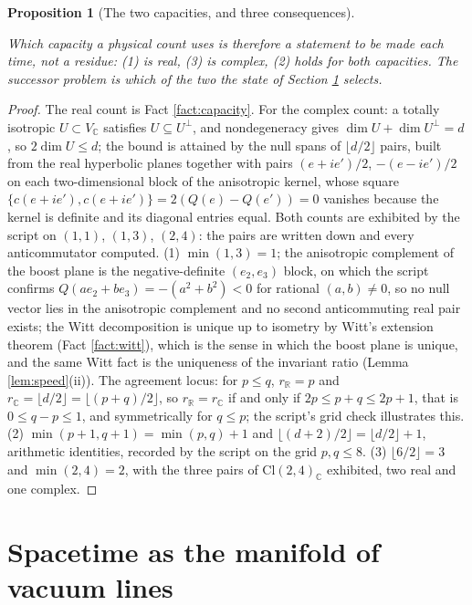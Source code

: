 \documentclass[11pt]{article}
\newtheorem{proposition}[theorem]{Proposition}
\theoremstyle{definition}
\newcommand{\Cl}{\mathrm{Cl}}
\newcommand{\R}{\mathbb{R}}
\newcommand{\C}{\mathbb{C}}
\begin{document}
\begin{proposition}[The two capacities, and three consequences]
\begin{enumerate}
\end{enumerate}
Which capacity a physical count uses is therefore a statement to be made each time, not a residue: (1) is real, (3) is complex, (2) holds for both capacities. The successor problem is which of the two the state of Section \ref{sec:vacua} selects.
\end{proposition}

\begin{proof}
The real count is Fact \ref{fact:capacity}. For the complex count: a totally isotropic $U \subset V_{\C}$ satisfies $U \subseteq U^{\perp}$, and nondegeneracy gives $\dim U + \dim U^{\perp} = d$, so $2\dim U \leq d$; the bound is attained by the null spans of $\lfloor d/2 \rfloor$ pairs, built from the real hyperbolic planes together with pairs $(e + ie')/2$, $-(e - ie')/2$ on each two-dimensional block of the anisotropic kernel, whose square $\{c(e+ie'), c(e+ie')\} = 2(Q(e) - Q(e')) = 0$ vanishes because the kernel is definite and its diagonal entries equal. Both counts are exhibited by the script on $(1,1)$, $(1,3)$, $(2,4)$: the pairs are written down and every anticommutator computed. (1) $\min(1,3) = 1$; the anisotropic complement of the boost plane is the negative-definite $(e_{2}, e_{3})$ block, on which the script confirms $Q(ae_{2} + be_{3}) = -(a^{2} + b^{2}) < 0$ for rational $(a,b) \neq 0$, so no null vector lies in the anisotropic complement and no second anticommuting real pair exists; the Witt decomposition is unique up to isometry by Witt's extension theorem (Fact \ref{fact:witt}), which is the sense in which the boost plane is unique, and the same Witt fact is the uniqueness of the invariant ratio (Lemma \ref{lem:speed}(ii)). The agreement locus: for $p \leq q$, $r_{\R} = p$ and $r_{\C} = \lfloor d/2 \rfloor = \lfloor (p+q)/2 \rfloor$, so $r_{\R} = r_{\C}$ if and only if $2p \leq p + q \leq 2p + 1$, that is $0 \leq q - p \leq 1$, and symmetrically for $q \leq p$; the script's grid check illustrates this. (2) $\min(p+1,q+1) = \min(p,q) + 1$ and $\lfloor (d+2)/2 \rfloor = \lfloor d/2 \rfloor + 1$, arithmetic identities, recorded by the script on the grid $p, q \leq 8$. (3) $\lfloor 6/2 \rfloor = 3$ and $\min(2,4) = 2$, with the three pairs of $\Cl(2,4)_{\C}$ exhibited, two real and one complex.
\end{proof}

\section{Spacetime as the manifold of vacuum lines}\label{sec:vacua}
\end{document}
